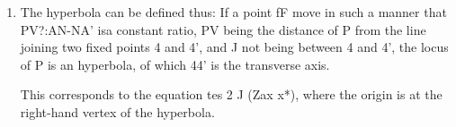 \begin{enumerate}
\item The hyperbola can be defined thus: If a point fF move in such a manner
    that PV?:AN-NA' isa constant ratio, PV being the distance of P from the line
    joining two fixed points 4 and 4’, and J not being between 4 and 4’, the
    locus of P is an hyperbola, of which 44’ is the transverse axis.

    This corresponds to the equation tes 2 J (Zax x*), where the origin is at
    the right-hand vertex of the hyperbola.

%
%
%
%
%
%
%
%
%
%
%
%
%
%
%
%
%
%
%
%
%
%
%
%
%
%
%
%
%
%
%
%
\end{enumerate}

